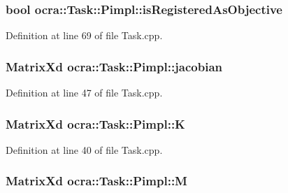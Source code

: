 \subsubsection[{\texorpdfstring{is\+Registered\+As\+Objective}{isRegisteredAsObjective}}]{\setlength{\rightskip}{0pt plus 5cm}bool ocra\+::\+Task\+::\+Pimpl\+::is\+Registered\+As\+Objective}\hypertarget{structocra_1_1Task_1_1Pimpl_a15289fedace1e80a0999cec502b60d23}{}\label{structocra_1_1Task_1_1Pimpl_a15289fedace1e80a0999cec502b60d23}


Definition at line 69 of file Task.\+cpp.

\subsubsection[{\texorpdfstring{jacobian}{jacobian}}]{\setlength{\rightskip}{0pt plus 5cm}Matrix\+Xd ocra\+::\+Task\+::\+Pimpl\+::jacobian}\hypertarget{structocra_1_1Task_1_1Pimpl_a79b15db6e75e0e793aa3fd0af5314f41}{}\label{structocra_1_1Task_1_1Pimpl_a79b15db6e75e0e793aa3fd0af5314f41}


Definition at line 47 of file Task.\+cpp.

\subsubsection[{\texorpdfstring{K}{K}}]{\setlength{\rightskip}{0pt plus 5cm}Matrix\+Xd ocra\+::\+Task\+::\+Pimpl\+::K}\hypertarget{structocra_1_1Task_1_1Pimpl_afc46e9f96d5c7123e7b086ea05144925}{}\label{structocra_1_1Task_1_1Pimpl_afc46e9f96d5c7123e7b086ea05144925}


Definition at line 40 of file Task.\+cpp.

\subsubsection[{\texorpdfstring{M}{M}}]{\setlength{\rightskip}{0pt plus 5cm}Matrix\+Xd ocra\+::\+Task\+::\+Pimpl\+::M}\hypertarget{structocra_1_1Task_1_1Pimpl_af7188c1ce99312015c8638699bd5754f}{}\label{structocra_1_1Task_1_1Pimpl_af7188c1ce99312015c8638699bd5754f}


